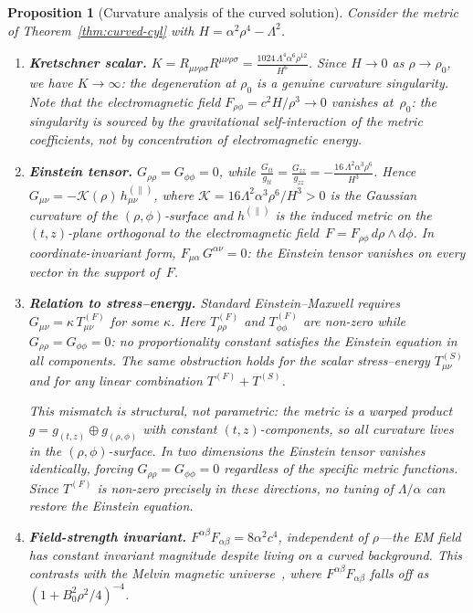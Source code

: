 \documentclass[pdflatex,sn-mathphys-num]{sn-jnl}
\theoremstyle{thmstyleone}%
\newtheorem{proposition}[theorem]{Proposition}
\theoremstyle{thmstyletwo}%
\theoremstyle{thmstylethree}%
\numberwithin{equation}{section}
\begin{document}
\begin{proposition}[Curvature analysis of the curved solution]
\label{prop:curvature}
Consider the metric of Theorem~\ref{thm:curved-cyl} with
$H = \alpha^2\rho^4 - \Lambda^2$.
\begin{enumerate}[label=\textup{(\roman*)},noitemsep]
\item \textbf{Kretschner scalar.}
$K = R_{\mu\nu\rho\sigma}R^{\mu\nu\rho\sigma}
    = \frac{1024\,\Lambda^4\alpha^6\rho^{12}}{H^6}$.
Since $H \to 0$ as $\rho \to \rho_0$, we have
$K \to \infty$: the degeneration at $\rho_0$ is a
genuine curvature singularity.  Note that the
electromagnetic field $F_{\rho\phi} = c^2 H/\rho^3 \to 0$
vanishes at~$\rho_0$: the singularity is sourced by
the gravitational self-interaction of the metric
coefficients, not by concentration of
electromagnetic energy.

\item \textbf{Einstein tensor.}
$G_{\rho\rho} = G_{\phi\phi} = 0$,
while
$\displaystyle
  \frac{G_{tt}}{g_{tt}}
  = \frac{G_{zz}}{g_{zz}}
  = -\frac{16\,\Lambda^2\alpha^3\rho^6}{H^3}$.
Hence $G_{\mu\nu} = -\mathcal{K}(\rho)\,h^{(\|)}_{\mu\nu}$,
where $\mathcal{K} = 16\Lambda^2\alpha^3\rho^6/H^3 > 0$
is the Gaussian curvature of the $(\rho,\phi)$-surface
and $h^{(\|)}$ is the induced metric on the
$(t,z)$-plane orthogonal to the electromagnetic
field~$F = F_{\rho\phi}\,d\rho \wedge d\phi$.
In coordinate-invariant form,
$F_{\mu\alpha}\,G^{\alpha\nu} = 0$:
the Einstein tensor vanishes on every vector in
the support of~$F$.

\item \textbf{Relation to stress--energy.}
Standard Einstein--Maxwell requires
$G_{\mu\nu} = \kappa\,T^{(F)}_{\mu\nu}$ for some
$\kappa$.  Here $T^{(F)}_{\rho\rho}$ and
$T^{(F)}_{\phi\phi}$ are non-zero while
$G_{\rho\rho} = G_{\phi\phi} = 0$: no proportionality
constant satisfies the Einstein equation in all
components.  The same obstruction holds for the scalar
stress--energy $T^{(S)}_{\mu\nu}$ and for any linear
combination $T^{(F)} + T^{(S)}$.

This mismatch is \emph{structural}, not parametric:
the metric is a warped product
$g = g_{(t,z)} \oplus g_{(\rho,\phi)}$
with constant $(t,z)$-components, so all curvature
lives in the $(\rho,\phi)$-surface.  In two
dimensions the Einstein tensor vanishes
identically, forcing $G_{\rho\rho} = G_{\phi\phi} = 0$
regardless of the specific metric functions.  Since
$T^{(F)}$ is non-zero precisely in these directions,
no tuning of $\Lambda/\alpha$ can restore the
Einstein equation.

\item \textbf{Field-strength invariant.}
$F^{\alpha\beta}F_{\alpha\beta}
  = 8\alpha^2 c^4$,
independent of $\rho$---the EM field has constant
invariant magnitude despite living on a curved
background.  This contrasts with the Melvin magnetic
universe~\cite{Melvin1964}, where
$F^{\alpha\beta}F_{\alpha\beta}$ falls off as
$(1 + B_0^2\rho^2/4)^{-4}$.
\end{enumerate}
\end{proposition}
\end{document}
